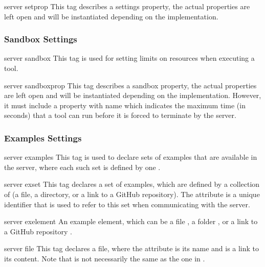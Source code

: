 \bigskip
\xmlstruct
{server}
{setprop}
{%
%
  This tag describes a settings property, the actual properties are
  left open and will be instantiated depending on the implementation.
%
}

\subsubsection{Sandbox Settings}

\bigskip
\xmlstruct
{server}
{sandbox}
{%
%
  This tag is used for setting limits on resources when executing a
  tool.
%
}

\bigskip
\xmlstruct
{server}
{sandboxprop}
{%
%
  This tag describes a sandbox property, the actual properties are
  left open and will be instantiated depending on the
  implementation. However, it must include a property with name
   which indicates the maximum time (in
  seconds) that a tool can run before it is forced to terminate by the
  server.
%
}

\subsubsection{Examples Settings}

\bigskip
\xmlstruct
{server}
{examples}
{%
%
  This tag is used to declare sets of examples that are available in
  the server, where each such set is defined by one
  .
%
}


\bigskip
\xmlstruct
{server}
{exset}
{%
%
  This tag declares a set of examples, which are defined by a
  collection of  (a file, a directory,
  or a link to a GitHub repository).
%
  The attribute  is a unique identifier that is used
  to refer to this set when communicating with the server.
%
}


\bigskip
\xmlstruct
{server}
{exelement}
{%
%
  An example element, which can be a file , a
  folder , or a link to a GitHub repository
  .
%
}



\bigskip
\xmlstruct
{server}
{file}
{%
%
  This tag declares a file, where the  attribute
  is its name and  is a link to its content. Note
  that  is not necessarily the same as the one in
  .
%
}


